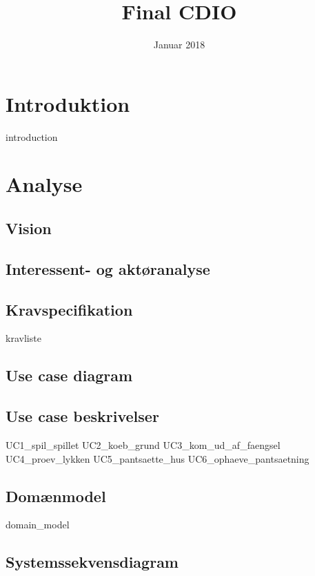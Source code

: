 \documentclass{article}
\title{Final CDIO}
\author{}
\date{Januar 2018}
\begin{document}
{\selectfont
\maketitle
\thispagestyle{empty}
\newpage
\tableofcontents
\thispagestyle{empty}
\newpage
\clearpage
\setcounter{page}{1}

\section{Introduktion}
{introduction}

\section{Analyse}
\subsection{Vision}

\subsection{Interessent- og aktøranalyse}

\subsection{Kravspecifikation}
{kravliste}

\subsection{Use case diagram}
\newpage
\subsection{Use case beskrivelser}
{UC1_spil_spillet}
{UC2_koeb_grund}
{UC3_kom_ud_af_faengsel}
{UC4_proev_lykken}
{UC5_pantsaette_hus}
{UC6_ophaeve_pantsaetning}

\newpage
\subsection{Domænmodel}
{domain_model}

\subsection{Systemssekvensdiagram}

}
\end{document}
